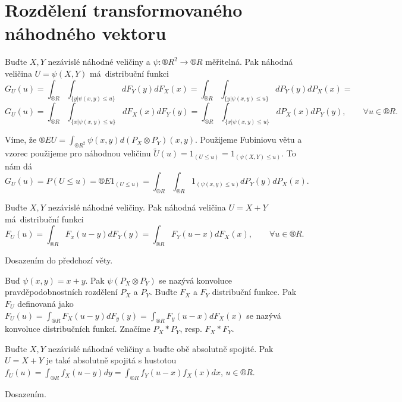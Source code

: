 \documentclass[12pt]{article}					%
\begin{document}

\section{Rozdělení transformovaného náhodného vektoru}
\begin{veta}
	Buďte $X, Y$ nezávislé náhodné veličiny a $\psi: ®R^2 \rightarrow ®R$ měřitelná. Pak náhodná veličina $U = \psi(X, Y)$ má distribuční funkci
	$$ G_U(u) = \int_{®R} \int_{\{y | \psi(x, y) ≤ u\}} dF_Y(y) dF_X(x) = \int_{®R} \int_{\{y | \psi(x, y) ≤ u\}} dP_Y(y) dP_X(x) = $$
	$$ G_U(u) = \int_{®R} \int_{\{x | \psi(x, y) ≤ u\}} dF_X(x) dF_Y(y) = \int_{®R} \int_{\{x | \psi(x, y) ≤ u\}} dP_X(x) dP_Y(y), \qquad \forall u \in ®R. $$

	\begin{dukazin}
		Víme, že $®E U = \int_{®R^2} \psi(x, y) d(P_X \otimes P_Y)(x, y)$. Použijeme Fubiniovu větu a vzorec použijeme pro náhodnou veličinu $\tilde{U}(u) = 1_{(U ≤ u)} = 1_{(\psi(X, Y) ≤ u)}$. To nám dá
		$$ G_U(u) = P(U ≤ u) = ®E 1_{(U ≤ u)} = \int_{®R} \int_{®R} 1_{(\psi(x, y) ≤ u)} dP_Y(y) dP_X(x). $$
	\end{dukazin}
\end{veta}

\begin{veta}
	Buďte $X, Y$ nezávislé náhodné veličiny. Pak náhodná veličina $U = X + Y$ má distribuční funkci
	$$ F_U(u) = \int_{®R}F_x(u - y) dF_Y(y) = \int_{®R} F_Y(u - x) dF_X(x), \qquad \forall u \in ®R. $$

	\begin{dukazin}
		Dosazením do předchozí věty.
	\end{dukazin}
\end{veta}

\begin{definice}[Konvoluce]
	Buď $\psi(x, y) = x + y$. Pak $\psi(P_X \otimes P_Y)$ se nazývá konvoluce pravděpodobnostních rozdělení $P_X$ a $P_Y$. Buďte $F_X$ a $F_Y$ distribuční funkce. Pak $F_U$ definovaná jako $F_U(u) = \int_{®R} F_X(u - y) dF_y(y) = \int_{®R} F_y(u - x) dF_X(x)$ se nazývá konvoluce distribučních funkcí. Značíme $P_X * P_Y$, resp. $F_X * F_Y$.
\end{definice}

\begin{dusledek}
	Buďte $X, Y$ nezávislé náhodné veličiny a buďte obě absolutně spojité. Pak $U = X + Y$ je také absolutně spojitá s hustotou $f_U(u) = \int_{®R}f_X(u - y) dy = \int_{®R} f_Y(u - x)f_X(x) dx$, $u \in ®R$.

	\begin{dukazin}
		Dosazením.
	\end{dukazin}
\end{dusledek}
\end{document}
